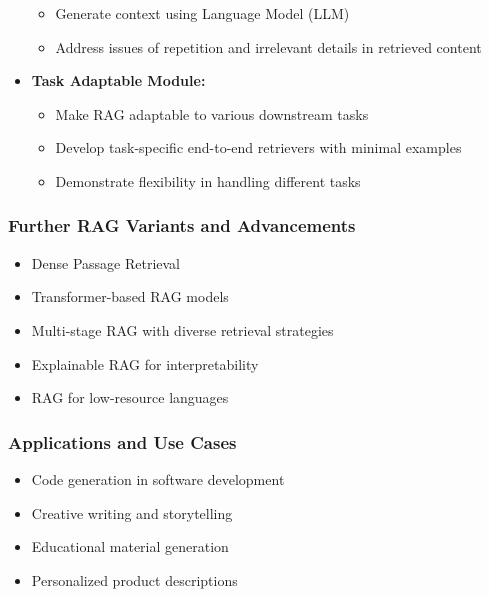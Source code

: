 \begin{frame}[fragile]
\begin{itemize}
          \begin{itemize}
              \item Generate context using Language Model (LLM)
              \item Address issues of repetition and irrelevant details in retrieved content
          \end{itemize}
    \item \textbf{Task Adaptable Module:}
          \begin{itemize}
              \item Make RAG adaptable to various downstream tasks
              \item Develop task-specific end-to-end retrievers with minimal examples
              \item Demonstrate flexibility in handling different tasks
          \end{itemize}
  \end{itemize}

\end{frame}

\begin{frame}[fragile]\frametitle{Further RAG Variants and Advancements}

\begin{itemize}
\item Dense Passage Retrieval
\item Transformer-based RAG models
\item Multi-stage RAG with diverse retrieval strategies
\item Explainable RAG for interpretability
\item RAG for low-resource languages
\end{itemize}	

\end{frame}

\begin{frame}[fragile]\frametitle{Applications and Use Cases}

\begin{itemize}
\item Code generation in software development
\item Creative writing and storytelling
\item Educational material generation
\item Personalized product descriptions
\end{itemize}	

\end{frame}


